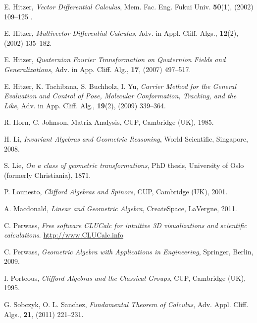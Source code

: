 \documentclass[cameraready]{jcmsi}%
\begin{document}
\begin{thebibliography}{99}
  E. Hitzer, 
  \textit{Vector Differential Calculus}, 
  Mem. Fac. Eng. Fukui Univ. \textbf{50}(1), 
  (2002) 109--125 .
  
  E. Hitzer, 
  \textit{Multivector Differential Calculus}, 
  Adv. in Appl. Cliff. Algs., \textbf{12}(2), 
  (2002) 135--182.
  
  E. Hitzer,
  \textit{Quaternion Fourier Transformation on Quaternion
  Fields and Generalizations}, 
  Adv. in App. Cliff. Alg., \textbf{17}, 
  (2007) 497--517.  
    
  E. Hitzer, K. Tachibana, S. Buchholz, I. Yu, 
  \textit{Carrier Method for the General Evaluation and
  Control of Pose, Molecular Conformation, Tracking, and the Like},
  Adv. in App. Cliff. Alg.,  \textbf{19}(2), 
  (2009) 339--364.
  
  R. Horn, C. Johnson,
  Matrix Analysis, 
  CUP, Cambridge (UK), 1985.
  
  H. Li,
  \textit{Invariant Algebras and Geometric Reasoning},
  World Scientific, Singapore, 2008.
  
  S. Lie, 
  \textit{On a class of geometric transformations},
  PhD thesis, University of Oslo (formerly Christiania), 1871. 
    
  P. Lounesto,
  \textit{Clifford Algebras and Spinors},
  CUP, Cambridge (UK), 2001. 
  
  A. Macdonald,
  \textit{Linear and Geometric Algebra},
  CreateSpace, LaVergne, 2011. 
  
  
  C. Perwass, \textit{Free software CLUCalc for intuitive 3D visualizations and scientific calculations}.  
  \url{http://www.CLUCalc.info}
  
  C. Perwass, 
  \textit{Geometric Algebra with Applications in Engineering}, 
  Springer, Berlin, 2009.
  
  I. Porteous, 
  \textit{Clifford Algebras and the Classical Groups},
  CUP, Cambridge (UK), 1995.
  
  G. Sobczyk, O. L. Sanchez,
  \textit{Fundamental Theorem of Calculus},
  Adv. Appl. Cliff. Algs., \textbf{21},  
  (2011) 221--231.
  

\end{thebibliography}
\end{document}
